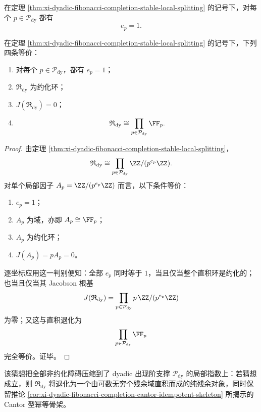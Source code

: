 \begin{conjecture}\label{conj:xi-dyadic-fibonacci-completion-reducedness}
在定理 \ref{thm:xi-dyadic-fibonacci-completion-stable-local-splitting} 的记号下，对每个 \(p\in\mathcal P_{\mathrm{dy}}\) 都有
\[
e_p=1.
\]
\end{conjecture}

\begin{proposition}\label{prop:xi-dyadic-fibonacci-completion-reduced-equivalences}
在定理 \ref{thm:xi-dyadic-fibonacci-completion-stable-local-splitting} 的记号下，下列四条等价：
\begin{enumerate}
  \item 对每个 \(p\in\mathcal P_{\mathrm{dy}}\)，都有 \(e_p=1\)；
  \item \(\mathfrak R_{\mathrm{dy}}\) 为约化环；
  \item \(J(\mathfrak R_{\mathrm{dy}})=0\)；
  \item
  \[
  \mathfrak R_{\mathrm{dy}}
  \cong
  \prod_{p\in\mathcal P_{\mathrm{dy}}}\FF_p.
  \]
\end{enumerate}
\end{proposition}
\begin{proof}
由定理 \ref{thm:xi-dyadic-fibonacci-completion-stable-local-splitting}，
\[
\mathfrak R_{\mathrm{dy}}
\cong
\prod_{p\in\mathcal P_{\mathrm{dy}}}\ZZ/(p^{e_p}\ZZ).
\]
对单个局部因子 \(A_p=\ZZ/(p^{e_p}\ZZ)\) 而言，以下条件等价：
\begin{enumerate}
  \item \(e_p=1\)；
  \item \(A_p\) 为域，亦即 \(A_p\cong \FF_p\)；
  \item \(A_p\) 为约化环；
  \item \(J(A_p)=pA_p=0\)。
\end{enumerate}
逐坐标应用这一判别便知：全部 \(e_p\) 同时等于 \(1\)，当且仅当整个直积环是约化的；也当且仅当其 Jacobson 根基
\[
J(\mathfrak R_{\mathrm{dy}})
=
\prod_{p\in\mathcal P_{\mathrm{dy}}}p\,\ZZ/(p^{e_p}\ZZ)
\]
为零；又这与直积退化为
\[
\prod_{p\in\mathcal P_{\mathrm{dy}}}\FF_p
\]
完全等价。证毕。
\end{proof}

该猜想把全部非约化障碍压缩到了 dyadic 出现阶支撑 \(\mathcal P_{\mathrm{dy}}\) 的局部指数上：若猜想成立，则 \(\mathfrak R_{\mathrm{dy}}\) 将退化为一个由可数无穷个残余域直积而成的纯残余对象，同时保留推论 \ref{cor:xi-dyadic-fibonacci-completion-cantor-idempotent-skeleton} 所揭示的 Cantor 型幂等骨架。

\endinput

